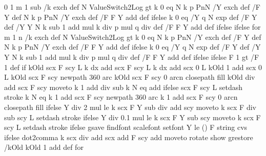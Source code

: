 {{    0 1 m 1 sub {
      /k exch def       %
      N ValueSwitch2Log gt {  k 0 eq
        { N k p PnN /Y exch def /F Y def }
        { N k p PnN /Y exch def /F F Y add def }
        ifelse 
      }{ k 0 eq
         { /Y q N exp def /F Y def }
         { /Y Y N k sub 1 add mul k div p mul q div def
           /F F Y add def
         } ifelse
       } ifelse
     } for
    m 1 n {             %
      /k exch def       %
      N ValueSwitch2Log gt 
        { k 0 eq
          { N k p PnN /Y exch def /F Y def }
          { N k p PnN /Y exch def /F F Y add def } 
        ifelse }
        {  k 0 eq
          { /Y q N exp def /F Y def }
          { /Y Y N k sub 1 add mul k div p mul q div def /F F Y add def
        } ifelse
      } ifelse  %
      F 1 gt { /F 1 def } if
      \ifPst@markZeros kOld scx F scy L k dx add scx F scy L k dx add scx 0 L kOld 1 add scx 0 L
      \else
       kOld scx F scy newpath  360 arc kOld scx F scy  0 arcn closepath \pst@usecolor\psk@LineEndColorL fill
      kOld \ifPst@LineEnding\psFunc@radiusout\pst@number\psxunit div add \fi
      scx F scy moveto
      k 1 add
      \ifPst@LineEnding\psFunc@radiusout\pst@number\psxunit div sub \fi
       k N eq
      { \psFunc@rightEnd add }
      { } ifelse
      scx F scy L \pst@usecolor{} setdash stroke
      \ifPst@LineEnding
      k N eq
      { }
      { k 1 add scx F scy newpath  360 arc k 1 add scx F scy  0 arcn closepath \pst@usecolor\psk@LineEndColorR fill }
      ifelse
        \ifPst@VLines
        Y \psFunc@radiusout\pst@number\psyunit div 2 mul le
        { }
        { k scx F Y sub \psFunc@radiusout\pst@number\psyunit div add scy moveto k scx F \psFunc@radiusout\pst@number\psyunit div sub scy L \pst@usecolor{} setdash stroke } ifelse \fi
      \else
      \ifPst@VLines
      Y \psFunc@radiusout\pst@number\psyunit div 0.1 mul le
      { }
      { k scx F Y sub scy moveto k scx F scy L \pst@usecolor{} setdash stroke } ifelse
     \fi\fi\fi
      \ifPst@printValue
        gsave \psk@PSfont\space findfont \psk@fontscale scalefont setfont \pst@usecolor\psk@LabelColor %
        Y \psFunc@PrintVLimit le { () } { F \psk@valuewidth\space string cvs } ifelse
        \ifPst@comma dot2comma \fi
        k scx  div add \psFunc@xlabelsep scx add
        F scy \pst@number\pslabelsep add moveto
        \psFunc@langle rotate show grestore
      \fi
      /kOld kOld 1 add def
    } for
  }%
  \end@OpenObj%
}%
